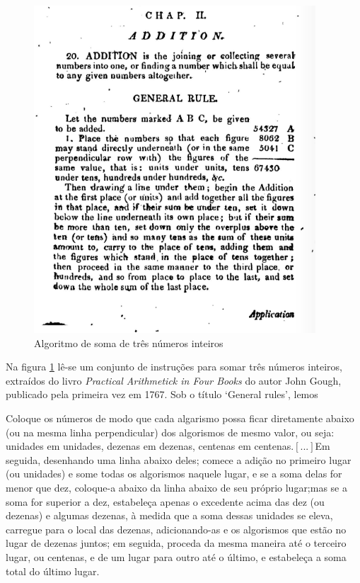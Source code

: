 \begin{figure}[!htb]
	\caption{Algoritmo de soma de três números inteiros}
	\begin{center}
	    \includegraphics[scale=1]{imagens/algorithm.png}
	\end{center}
	\label{fig:algoritmo}
\end{figure}

Na figura \ref{fig:algoritmo} lê-se um conjunto de instruções para somar três números inteiros, extraídos do livro \textit{Practical Arithmetick in Four Books} do autor John Gough, publicado pela primeira vez em 1767. Sob o título `General rules', lemos

\begin{citacao}
	Coloque os números de modo que cada algarismo possa ficar diretamente abaixo (ou na mesma linha perpendicular) dos algorismos de mesmo valor, ou seja: unidades em unidades, dezenas em dezenas, centenas em centenas.$[...]$Em seguida, desenhando uma linha abaixo deles; comece a adição no primeiro lugar (ou unidades) e some todas os algorismos naquele lugar, e se a soma delas for menor que dez, coloque-a abaixo da linha abaixo de seu próprio lugar;mas se a soma for superior a dez, estabeleça apenas o excedente acima das dez (ou dezenas) e algumas dezenas, à medida que a soma dessas unidades se eleva, carregue para o local das dezenas, adicionando-as e os algorismos que estão no lugar de dezenas juntos; em seguida, proceda da mesma maneira até o terceiro lugar, ou centenas, e de um lugar para outro até o último, e estabeleça a soma total do último lugar.  
\end{citacao}

